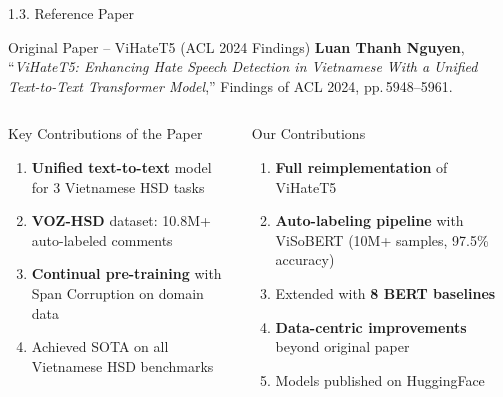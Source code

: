 \documentclass[11pt, aspectratio=169]{beamer}
\begin{document}
\begin{frame}[shrink=10]{1.3. Reference Paper}

\begin{block}{Original Paper -- ViHateT5 (ACL 2024 Findings)}
  \textbf{Luan Thanh Nguyen}, ``\textit{ViHateT5: Enhancing Hate Speech Detection in Vietnamese With a Unified Text-to-Text Transformer Model},'' Findings of ACL 2024, pp.\,5948--5961.
\end{block}
\vspace{0.2cm}

\begin{columns}[T]
  \begin{block}{Key Contributions of the Paper}
    \begin{enumerate}
      \item \textbf{Unified text-to-text} model for 3 Vietnamese HSD tasks
      \item \textbf{VOZ-HSD} dataset: 10.8M+ auto-labeled comments
      \item \textbf{Continual pre-training} with Span Corruption on domain data
      \item Achieved SOTA on all Vietnamese HSD benchmarks
    \end{enumerate}
  \end{block}

  \begin{block}{Our Contributions}
    \begin{enumerate}
      \item \textbf{Full reimplementation} of ViHateT5
      \item \textbf{Auto-labeling pipeline} with ViSoBERT (10M+ samples, 97.5\% accuracy)
      \item Extended with \textbf{8 BERT baselines}
      \item \textbf{Data-centric improvements} beyond original paper
      \item Models published on HuggingFace
    \end{enumerate}
  \end{block}
\end{columns}
\end{frame}
\end{document}

